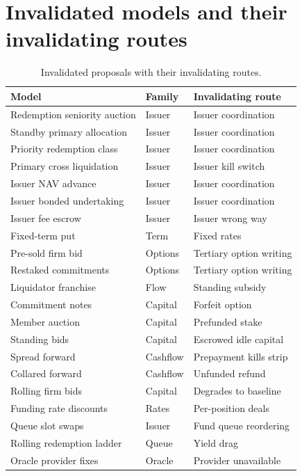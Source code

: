 \documentclass[11pt,a4paper]{article}
\begin{document}
\clearpage
\appendix

\section{Invalidated models and their invalidating routes}\label{sec:invalidated}

\begin{table}[h]
\centering
\begin{tabular}{@{}lll@{}}
\toprule
Model & Family & Invalidating route \\
\midrule
Redemption seniority auction & Issuer & Issuer coordination \\
Standby primary allocation & Issuer & Issuer coordination \\
Priority redemption class & Issuer & Issuer coordination \\
Primary cross liquidation & Issuer & Issuer kill switch \\
Issuer NAV advance & Issuer & Issuer coordination \\
Issuer bonded undertaking & Issuer & Issuer coordination \\
Issuer fee escrow & Issuer & Issuer wrong way \\
Fixed-term put & Term & Fixed rates \\
Pre-sold firm bid & Options & Tertiary option writing \\
Restaked commitments & Options & Tertiary option writing \\
Liquidator franchise & Flow & Standing subsidy \\
Commitment notes & Capital & Forfeit option \\
Member auction & Capital & Prefunded stake \\
Standing bids & Capital & Escrowed idle capital \\
Spread forward & Cashflow & Prepayment kills strip \\
Collared forward & Cashflow & Unfunded refund \\
Rolling firm bids & Capital & Degrades to baseline \\
Funding rate discounts & Rates & Per-position deals \\
Queue slot swaps & Issuer & Fund queue reordering \\
Rolling redemption ladder & Queue & Yield drag \\
Oracle provider fixes & Oracle & Provider unavailable \\
\bottomrule
\end{tabular}
\caption{Invalidated proposals with their invalidating routes.}
\end{table}
\end{document}
